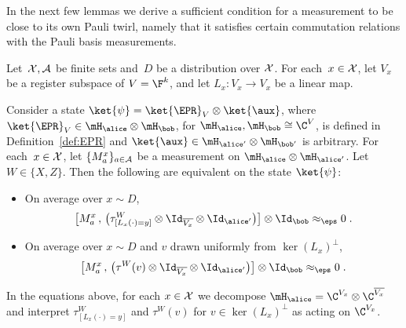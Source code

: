 In the next few lemmas we derive a sufficient condition for a measurement to be
close to its own Pauli twirl, namely that it satisfies certain commutation
relations with the Pauli basis measurements.

\begin{lemma}
  \label{lem:W} 
  Let~$\cal{X},\cal{A}$ be finite sets and~$D$ be a distribution over $\cal{X}$.
  For each~$x \in \cal{X}$, let $V_x$ be a register subspace of $V = \F^k$, and
  let $L_x:V_x \to V_x$ be a linear map.

  Consider a state $\ket{\psi} = \ket{\EPR}_V \otimes \ket{\aux}$, where
  $\ket{\EPR}_{V} \in \mH_\alice \otimes \mH_\bob$, for $\mH_\alice,\mH_\bob
  \cong \C^{V}$, is defined in Definition~\ref{def:EPR} and $\ket{\aux}\in
  \mH_{\alice'} \otimes \mH_{\bob'}$ is arbitrary.
  For each~$x \in \cal{X}$, let $\{M^{x}_a\}_{a \in \cal{A}}$ be a measurement
  on $\mH_{\alice} \otimes \mH_{\alice'}$.
  Let $W\in\{X,Z\}$.
  Then the following are equivalent on the state $\ket{\psi}$:
	\begin{itemize}
	\item On average over $x\sim D$, 
    \begin{equation*}
      \big[ M^x_a \,,\, \big(\tau^W_{[L_x(\cdot)=y]} \otimes \Id_{\overline{V_x}}
      \otimes \Id_{\alice'}\big) \big]  \otimes \Id_\bob \approx_\eps 0\;.
    \end{equation*}
  \item On average over $x \sim D$ and $v$ drawn uniformly from $\ker
    (L_x)^\perp$,
    \begin{equation*}
      \big[ M^x_a \,,\, \big( \tau^W(v) \otimes \Id_{\overline{V_x}} \otimes
      \Id_{\alice'} \big) \big]  \otimes \Id_\bob \approx_\eps 0\;.
    \end{equation*}
	\end{itemize}
	In the equations above, for each $x \in \cal{X}$ we decompose $\mH_\alice = \C^{V_x} \otimes \C^{\overline{V_x}}$ and interpret $\tau^W_{[L_x(\cdot)=y]}$ and $\tau^W(v)$ for $v \in \ker(L_x)^\perp$ as acting on $\C^{V_x}$. 
\end{lemma}

